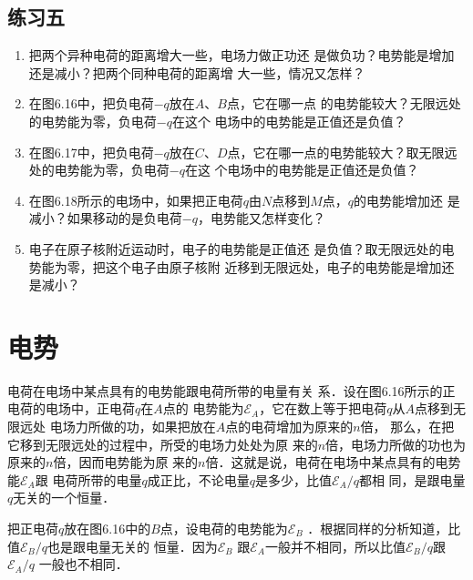 \subsection*{练习五}

\begin{enumerate}
	\item 把两个异种电荷的距离增大一些，电场力做正功还
是做负功？电势能是增加还是减小？把两个同种电荷的距离增
大一些，情况又怎样？
\item 在图6.16中，把负电荷$-q$放在$A$、$B$点，它在哪一点
的电势能较大？无限远处的电势能为零，负电荷$-q$在这个
电场中的电势能是正值还是负值？
\item 在图6.17中，把负电荷$-q$放在$C$、$D$点，它在哪一点的电势能较大？取无限远处的电势能为零，负电荷$-q$在这
个电场中的电势能是正值还是负值？
\item 在图6.18所示的电场中，如果把正电荷$q$由$N$点移到$M$点，$q$的电势能增加还
是减小？如果移动的是负电荷$-q$，电势能又怎样变化？
\begin{figure}[htp]\centering

    \caption{}
\end{figure}	

\item  电子在原子核附近运动时，电子的电势能是正值还
是负值？取无限远处的电势能为零，把这个电子由原子核附
近移到无限远处，电子的电势能是增加还是减小？
\end{enumerate}


\section{电势}
电荷在电场中某点具有的电势能跟电荷所带的电量有关
系．设在图6.16所示的正电荷的电场中，正电荷$q$在$A$点的
电势能为$\mathcal{E}_A$，它在数上等于把电荷$q$从$A$点移到无限远处
电场力所做的功，如果把放在$A$点的电荷增加为原来的$n$倍，
那么，在把它移到无限远处的过程中，所受的电场力处处为原
来的$n$倍，电场力所做的功也为原来的$n$倍，因而电势能为原
来的$n$倍．这就是说，电荷在电场中某点具有的电势能$\mathcal{E}_A$跟
电荷所带的电量$q$成正比，不论电量$q$是多少，比值$\mathcal{E}_A/q$都相
同，是跟电量$q$无关的一个恒量．

把正电荷$q$放在图6.16中的$B$点，设电荷的电势能为$\mathcal{E}_B$
．根据同样的分析知道，比值$\mathcal{E}_B/q$也是跟电量无关的
恒量．因为$\mathcal{E}_B$
跟$\mathcal{E}_A$一般并不相同，所以比值$\mathcal{E}_B/q$跟$\mathcal{E}_A/q$
一般也不相同．

